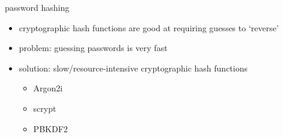 \begin{frame}{password hashing}
    \begin{itemize}
        \item cryptographic hash functions are good at requiring guesses to `reverse'
            \vspace{.5cm}
        \item problem: guessing passwords is very fast
        \item solution: slow/resource-intensive cryptographic hash functions
            \begin{itemize}
            \item Argon2i
            \item scrypt
            \item PBKDF2
            \end{itemize}
    \end{itemize}
\end{frame}
